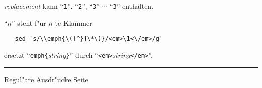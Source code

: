 \begin{slide}{}
\textsl{replacement} kann  ``\texttt{1}'', ``\texttt{2}'',
``\texttt{3}'' $\cdots$ ``\texttt{3}'' enthalten.
      
      ``\texttt{$n$}'' steht f"ur $n$-te Klammer

      \begin{verbatim}
   sed 's/\\emph{\([^}]\*\)}/<em>\1<\/em>/g' 
      \end{verbatim}
      \vspace{-0.5cm}

      ersetzt ``\texttt{emph\{}\textsl{string}\texttt{\}}'' durch 
      ``\texttt{<em>}\emph{string}\texttt{</em>}''.


\setcounter{page}{1}
\vspace*{\fill}
\tiny \addtocounter{mypage}{1}
\rule{17cm}{1mm}
Regul"are Ausdr"ucke  \hspace*{\fill} Seite 
\end{slide}


